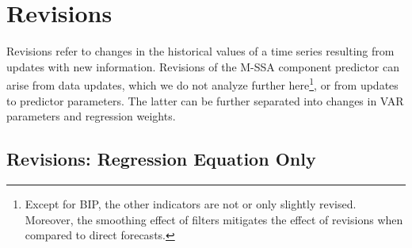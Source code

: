 \documentclass[a4paper]{article}
\begin{document}
\section{Revisions}\label{revisions}



Revisions refer to changes in the historical values of a time series resulting from updates with new information. Revisions of the M-SSA component predictor can arise from data updates, which we do not analyze further here\footnote{Except for BIP, the other indicators are not or only slightly revised. Moreover, the smoothing effect of filters mitigates the effect of revisions when compared to direct forecasts.}, or from updates to predictor parameters. The latter can be further separated into changes in VAR parameters and regression weights. 


\subsection{Revisions: Regression Equation Only}
\end{document}
